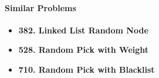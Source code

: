 \paragraph{Similar Problems}
\begin{itemize}
\item \textbf{382. Linked List Random Node}
\item \textbf{528. Random Pick with Weight}
\item \textbf{710. Random Pick with Blacklist}
\end{itemize}

